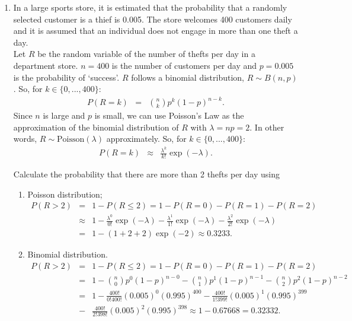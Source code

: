 \documentclass[12pt,thmsa]{article}
\begin{document}
\begin{enumerate}%

\item In a large sports store, it is estimated that the probability that a randomly selected customer is a thief is 0.005. The store welcomes 400 customers daily and it is assumed that an individual does not engage in more than one theft a day.\\

Let $ R $ be the random variable of the number of thefts per day in a department store. $ n = 400$ is the number of customers per day and $ p = 0.005$ is the probability of `success'. $ R $ follows a binomial distribution, $R \sim B(n,p)$. So, for $k \in \{0,...,400\}$:
\begin{eqnarray*}
P(R=k) & = & \left. \binom{n}{k}p^{k}(1-p)^{n-k}. \right. \nonumber
\end{eqnarray*}
Since $ n $ is large and $ p $ is small, we can use Poisson's Law as the approximation of the binomial distribution of $ R $ with $\lambda=np=2$. In other words, $R \sim \text{Poisson}(\lambda)$ approximately. So, for $k \in \{0,...,400\}$:
\begin{eqnarray*}
P(R=k) & \approx & \left. \frac{\lambda^{k}}{k!}\exp(-\lambda). \right. \nonumber
\end{eqnarray*}



\noindent Calculate the probability that there are more than 2 thefts per day using
\begin{enumerate}
\item Poisson distribution;
\begin{eqnarray*}
P(R>2) & = & \left. 1- P(R \leq 2) = 1- P(R=0)-P(R=1)-P(R=2) \right. \nonumber \\
& \approx & \left. 1-\frac{\lambda^{0}}{0!}\exp(-\lambda) - \frac{\lambda^{1}}{1!}\exp(-\lambda) - \frac{\lambda^{2}}{2!}\exp(-\lambda) \right. \nonumber \\
& = & \left. 1-(1+2+2)\exp(-2) \approx 0.3233. \right. \nonumber
\end{eqnarray*}
\item Binomial distribution.
\begin{eqnarray*}
P(R>2) & = & \left. 1- P(R \leq 2) = 1- P(R=0)-P(R=1)-P(R=2) \right. \nonumber \\
& = & \left. 1- \binom{n}{0}p^{0}(1-p)^{n-0}-\binom{n}{1}p^{1}(1-p)^{n-1} - \binom{n}{2}p^{2}(1-p)^{n-2} \right. \nonumber \\
& = & \left.  1-\frac{400!}{0!400!}(0.005)^{0}(0.995)^{400} -\frac{400!}{1!399!}(0.005)^{1}(0.995)^{399} \right. \nonumber \\
& -&\left. \frac{400!}{2!398!}(0.005)^{2}(0.995)^{398} \approx  1 - 0.67668 = 0.32332.  \right. \nonumber
\end{eqnarray*}
\end{enumerate}


\end{enumerate}
\end{document}
